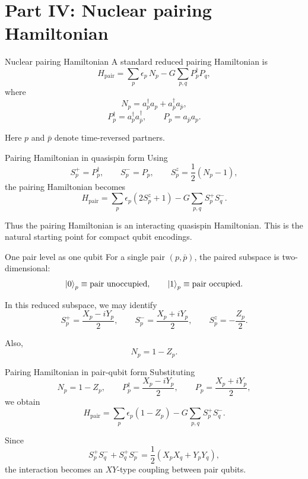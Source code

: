 \documentclass[aspectratio=169]{beamer}
\begin{document}
\section{Part IV: Nuclear pairing Hamiltonian}

\begin{frame}{Nuclear pairing Hamiltonian}
A standard reduced pairing Hamiltonian is
\[
H_{\mathrm{pair}}
=
\sum_{p} \epsilon_p \, N_p
-
G \sum_{p,q} P_p^\dagger P_q,
\]
where
\[
N_p = a_p^\dagger a_p + a_{\bar p}^\dagger a_{\bar p},
\]
\[
P_p^\dagger = a_p^\dagger a_{\bar p}^\dagger,
\qquad
P_p = a_{\bar p} a_p.
\]

Here \(p\) and \(\bar p\) denote time-reversed partners.
\end{frame}

\begin{frame}{Pairing Hamiltonian in quasispin form}
Using
\[
S_p^+ = P_p^\dagger,\qquad
S_p^- = P_p,\qquad
S_p^z = \frac12(N_p-1),
\]
the pairing Hamiltonian becomes
\[
H_{\mathrm{pair}}
=
\sum_p \epsilon_p (2S_p^z+1)
-
G \sum_{p,q} S_p^+ S_q^-.
\]

Thus the pairing Hamiltonian is an interacting quasispin Hamiltonian.
This is the natural starting point for compact qubit encodings.
\end{frame}

\begin{frame}{One pair level as one qubit}
For a single pair \((p,\bar p)\), the paired subspace is two-dimensional:
\[
\ket{0}_p \equiv \text{pair unoccupied},
\qquad
\ket{1}_p \equiv \text{pair occupied}.
\]

In this reduced subspace, we may identify
\[
S_p^+ = \frac{X_p-iY_p}{2},
\qquad
S_p^- = \frac{X_p+iY_p}{2},
\qquad
S_p^z = -\frac{Z_p}{2}.
\]

Also,
\[
N_p = 1-Z_p.
\]
\end{frame}

\begin{frame}{Pairing Hamiltonian in pair-qubit form}
Substituting
\[
N_p = 1-Z_p,
\qquad
P_p^\dagger = \frac{X_p-iY_p}{2},
\qquad
P_p = \frac{X_p+iY_p}{2},
\]
we obtain
\[
H_{\mathrm{pair}}
=
\sum_p \epsilon_p(1-Z_p)
-
G\sum_{p,q} S_p^+S_q^-.
\]

Since
\[
S_p^+S_q^- + S_q^+S_p^-
=
\frac12(X_pX_q+Y_pY_q),
\]
the interaction becomes an \(XY\)-type coupling between pair qubits.
\end{frame}
\end{document}
